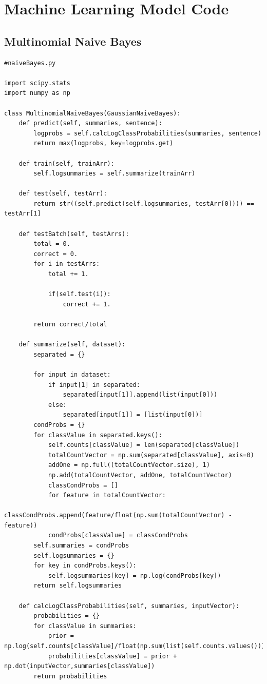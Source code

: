 \documentclass[12pt,a4paper,twoside,openright]{report}
\begin{document}
\appendix

\chapter{Machine Learning Model Code}

\section{Multinomial Naive Bayes}
\label{appendix:NB}

\begin{lstlisting}[caption={The \texttt{Python} code for Multinomial Naive Bayes},captionpos=b,label={lst:NB}]
#naiveBayes.py

import scipy.stats
import numpy as np

class MultinomialNaiveBayes(GaussianNaiveBayes):
    def predict(self, summaries, sentence):
        logprobs = self.calcLogClassProbabilities(summaries, sentence)
        return max(logprobs, key=logprobs.get)

    def train(self, trainArr):
        self.logsummaries = self.summarize(trainArr)

    def test(self, testArr):
        return str((self.predict(self.logsummaries, testArr[0]))) == testArr[1]

    def testBatch(self, testArrs):
        total = 0.
        correct = 0.
        for i in testArrs:
            total += 1.

            if(self.test(i)):
                correct += 1.

        return correct/total

    def summarize(self, dataset):
        separated = {}

        for input in dataset:
            if input[1] in separated:
                separated[input[1]].append(list(input[0]))
            else:
                separated[input[1]] = [list(input[0])]
        condProbs = {}
        for classValue in separated.keys():
            self.counts[classValue] = len(separated[classValue])
            totalCountVector = np.sum(separated[classValue], axis=0)
            addOne = np.full((totalCountVector.size), 1)
            np.add(totalCountVector, addOne, totalCountVector)
            classCondProbs = []
            for feature in totalCountVector:
                classCondProbs.append(feature/float(np.sum(totalCountVector) - feature))
            condProbs[classValue] = classCondProbs
        self.summaries = condProbs
        self.logsummaries = {}
        for key in condProbs.keys():
            self.logsummaries[key] = np.log(condProbs[key])
        return self.logsummaries

    def calcLogClassProbabilities(self, summaries, inputVector):
        probabilities = {}
        for classValue in summaries:
            prior = np.log(self.counts[classValue]/float(np.sum(list(self.counts.values()))))
            probabilities[classValue] = prior + np.dot(inputVector,summaries[classValue])
        return probabilities
\end{lstlisting}
\end{document}
